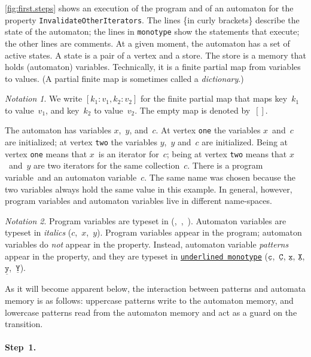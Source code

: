 \documentclass[preprint]{sigplanconf} %
\newcommand{\pattern}[1]{\ensuremath{\mathtt{\underline{#1}}}}
\theoremstyle{definition}
\theoremstyle{remark}
\newtheorem{notation}{Notation}
\begin{document}
\autoref{fig:first.steps} shows an execution of the program and of an automaton for the property \texttt{InvalidateOtherIterators}.
The lines \{in curly brackets\} describe the state of the automaton;
the lines in \texttt{monotype} show the statements that execute;
the other lines are comments.
At a given moment, the automaton has a set of active states.
A state is a pair of a vertex and a store.
The store is a memory that holds (automaton) variables.
Technically, it is a finite partial map from variables to values.
(A partial finite map is sometimes called a \emph{dictionary}.)

\begin{notation}
We write $[k_1:v_1,k_2:v_2]$ for the finite partial map that maps key~$k_1$ to value~$v_1$, and key~$k_2$ to value~$v_2$.
The empty map is denoted by~$[]$.
\end{notation}

The automaton has variables $x$,~$y$, and~$c$.
At vertex \texttt{one} the variables $x$~and~$c$ are initialized;
at vertex \texttt{two} the variables $y$,~$y$ and~$c$ are initialized.
Being at vertex \texttt{one} means that $x$~is an iterator for~$c$;
being at vertex \texttt{two} means that $x$~and~$y$ are two iterators for the same collection~$c$.
There is a program variable~\Verb@c@ and an automaton variable~$c$.
The same name was chosen because the two variables always hold the same value in this example.
In general, however, program variables and automaton variables live in different name-spaces.

\begin{notation}
Program variables are typeset in \Verb@monotype@ (\Verb@c@,~\Verb@i@,~\Verb@j@).
Automaton variables are typeset in \textit{italics} ($c$,~$x$,~$y$).
Program variables appear in the program;
automaton variables do \emph{not} appear in the property.
Instead, automaton variable \emph{patterns} appear in the property, and they are typeset in \texttt{\underline{underlined monotype}} (\pattern c,~\pattern C, \pattern x, \pattern X, \pattern y,~\pattern Y).
\end{notation}

As it will become apparent below, the interaction between patterns and automata memory is as follows: uppercase patterns write to the automaton memory, and lowercase patterns read from the automaton memory and act as a guard on the transition.

\paragraph{Step~1.}
\end{document}
